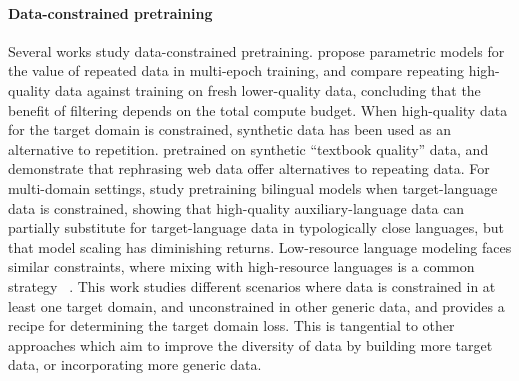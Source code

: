 \paragraph{Data-constrained pretraining}
Several works study data-constrained pretraining. \citet{hernandez2022scaling} propose parametric models for the value of repeated data in multi-epoch training, and \citet{goyal2024scaling} compare repeating high-quality data against training on fresh lower-quality data, concluding that the benefit of filtering depends on the total compute budget. When high-quality data for the target domain is constrained, synthetic data has been used as an alternative to repetition. \citet{gunasekar2023textbooks} pretrained on synthetic ``textbook quality'' data, and \citet{maini2024rephrasing} demonstrate that rephrasing web data offer alternatives to repeating data. For multi-domain settings, \citet{seto2025training} study pretraining bilingual models when target-language data is constrained, showing that high-quality auxiliary-language data can partially substitute for target-language data in typologically close languages, but that model scaling has diminishing returns. Low-resource language modeling faces similar constraints, where mixing with high-resource languages is a common strategy ~\citep{joshi2020state}. This work studies different scenarios where data is constrained in at least one target domain, and unconstrained in other generic data, and provides a recipe for determining the target domain loss.  This is tangential to other approaches which aim to improve the diversity of data by building more target data, or incorporating more generic data.





